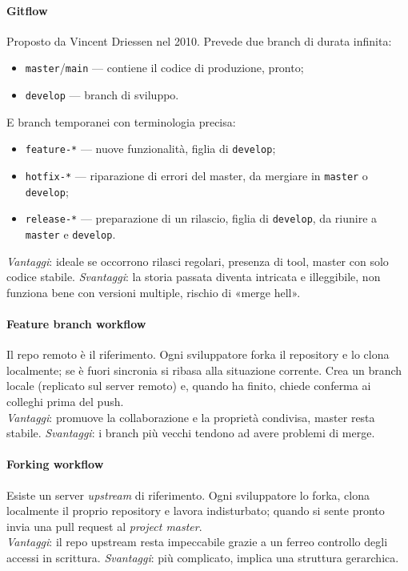 \documentclass[a4paper,12pt]{article}
\begin{document}
\paragraph{Gitflow} Proposto da Vincent Driessen nel 2010. Prevede due branch di durata
infinita:
\begin{itemize}
  \item \texttt{master}/\texttt{main} --- contiene il codice di produzione, pronto;
  \item \texttt{develop} --- branch di sviluppo.
\end{itemize}
E branch temporanei con terminologia precisa:
\begin{itemize}
  \item \texttt{feature-*} --- nuove funzionalità, figlia di \texttt{develop};
  \item \texttt{hotfix-*} --- riparazione di errori del master, da mergiare in
        \texttt{master} o \texttt{develop};
  \item \texttt{release-*} --- preparazione di un rilascio, figlia di \texttt{develop},
        da riunire a \texttt{master} e \texttt{develop}.
\end{itemize}
\emph{Vantaggi}: ideale se occorrono rilasci regolari, presenza di tool, master con solo
codice stabile.
\emph{Svantaggi}: la storia passata diventa intricata e illeggibile, non funziona bene
con versioni multiple, rischio di «merge hell».

\paragraph{Feature branch workflow} Il repo remoto è il riferimento. Ogni sviluppatore
forka il repository e lo clona localmente; se è fuori sincronia si ribasa alla situazione
corrente. Crea un branch locale (replicato sul server remoto) e, quando ha finito,
chiede conferma ai colleghi prima del push.\\
\emph{Vantaggi}: promuove la collaborazione e la proprietà condivisa, master resta
stabile.
\emph{Svantaggi}: i branch più vecchi tendono ad avere problemi di merge.

\paragraph{Forking workflow} Esiste un server \emph{upstream} di riferimento. Ogni
sviluppatore lo forka, clona localmente il proprio repository e lavora indisturbato;
quando si sente pronto invia una pull request al \emph{project master}.\\
\emph{Vantaggi}: il repo upstream resta impeccabile grazie a un ferreo controllo degli
accessi in scrittura.
\emph{Svantaggi}: più complicato, implica una struttura gerarchica.
\end{document}
